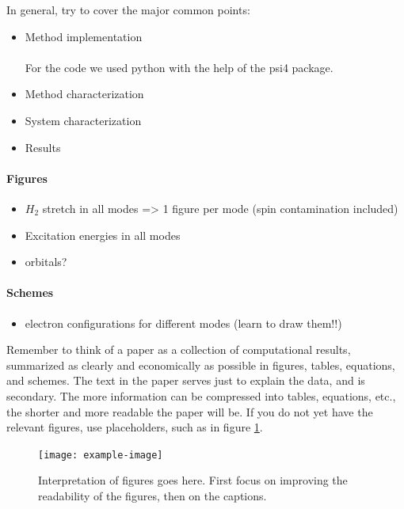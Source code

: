 \documentclass[twoside,twocolumn,9pt]{article}
\begin{document}
In general, try to cover the major common points:
\begin{itemize}
    \item Method implementation
    \paragraph*{}
    For the code we used python with the help of the psi4 package.
    \item Method characterization
    \item System characterization
    \item Results
\end{itemize}
\paragraph*{Figures}
\begin{itemize}
    \item $H_2$ stretch in all modes => 1 figure per mode (spin contamination included)
    \item Excitation energies in all modes 
    \item orbitals?
\end{itemize}
\paragraph*{Schemes}
\begin{itemize}
  \item electron configurations for different modes (learn to draw them!!)
\end{itemize}
Remember to think of a paper as a collection of computational results, summarized as clearly and economically as possible in figures, tables, equations, and schemes. The text in the paper serves just to explain the data, and is secondary. The more information can be compressed into tables, equations, etc., the shorter and more readable the paper will be. If you do not yet have the relevant figures, use placeholders, such as in figure \ref{fig:my_label}.

\begin{center}
    \begin{figure}
        \texttt{[image: example-image]}
        \caption{Interpretation of figures goes here. First focus on improving the readability of the figures, then on the captions.}
        \label{fig:my_label}
    \end{figure}
\end{center}
\end{document}
